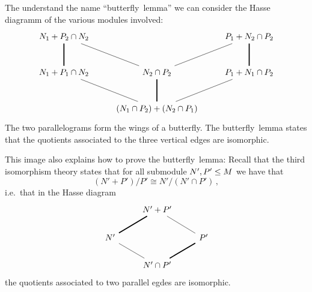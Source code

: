 \begin{fluff}
  The understand the name \enquote{butterfly~lemma} we can consider the Hasse diagramm of the various modules involved:
  \[
    \begin{tikzcd}[row sep = large]
        N_1 + P_2 \cap N_2
      & {}
      & P_1 + N_2 \cap P_2
      \\
        N_1 + P_1 \cap N_2
        \arrow[-, very thick]{u}
      & N_2 \cap P_2
        \arrow[-]{lu}
        \arrow[-]{ru}
      & P_1 + N_1 \cap P_2
        \arrow[-, very thick]{u}
      \\
        {}
      & (N_1 \cap P_2) + (N_2 \cap P_1)
        \arrow[-]{lu}
        \arrow[-, very thick]{u}
        \arrow[-]{ru}
      & {}
    \end{tikzcd}
  \]
  The two parallelograms form the wings of a butterfly.
  The butterfly~lemma states that the quotients associated to the three vertical edges are isomorphic.
  
  This image also explains how to prove the butterfly~lemma:
  Recall that the third isomorphism theory states that for all submodule $N', P' \leq M$ we have that
  \[
          (N' + P')/P'
    \cong N'/(N' \cap P') \,,
  \]
  i.e.\ that in the Hasse diagram
  \[
    \begin{tikzcd}
        {}
      & N' + P'
      & {}
      \\
        N'
        \arrow[-,very thick]{ru}
      & {}
      & P'
        \arrow[-]{lu}
      \\
        {}
      & N' \cap P'
        \arrow[-]{lu}
        \arrow[-,very thick]{ru}
      & {}
    \end{tikzcd}
  \]
  the quotients associated to two parallel egdes are isomorphic.
\end{fluff}


